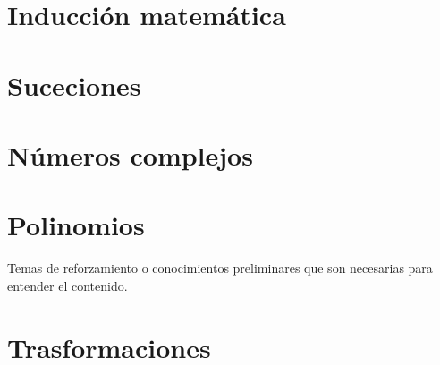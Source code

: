 \documentclass[
  16pt,
]{krantz}
\theoremstyle{definition}
\theoremstyle{definition}
\theoremstyle{definition}
\theoremstyle{definition}
\theoremstyle{remark}
\begin{document}
\hypertarget{inducciuxf3n-matemuxe1tica}{%
\chapter{Inducción matemática}\label{inducciuxf3n-matemuxe1tica}}

\hypertarget{suceciones}{%
\chapter{Suceciones}\label{suceciones}}

\hypertarget{nuxfameros-complejos}{%
\chapter{Números complejos}\label{nuxfameros-complejos}}

\hypertarget{polinomios}{%
\chapter{Polinomios}\label{polinomios}}

\hypertarget{appendix-apendice}{%
\appendix {}}


Temas de reforzamiento o conocimientos preliminares que son necesarias para entender el contenido.

\hypertarget{trasformaciones}{%
\chapter{Trasformaciones}\label{trasformaciones}}

  

\printindex
\end{document}
